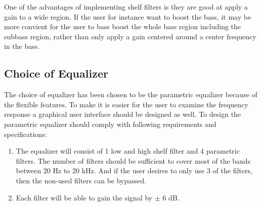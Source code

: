 One of the advantages of implementing shelf filters is they are good at apply a gain to a wide region. If the user for instance want to boost the bass, it may be more convient for the user to bass boost the whole bass region including the subbass region, rather than only apply a gain centered around a center frequency in the bass.

\subsection{Choice of Equalizer}

The choice of equalizer has been chosen to be the parametric equalizer because of the flexible features. To make it is easier for the user to examine the frequency response a graphical user interface should be designed as well. To design the parametric equalizer should comply with following requirements and specifications:
\begin{enumerate}
\item The equalizer will consist of 1 low and high shelf filter and 4 parametric filters. The number of filters should be sufficient to cover most of the bands between 20 Hz to 20 kHz. And if the user desires to only use 3 of the filters, then the non-used filters can be bypassed.
\item Each filter will be able to gain the signal by $\pm$ 6 dB.
\end{enumerate}







